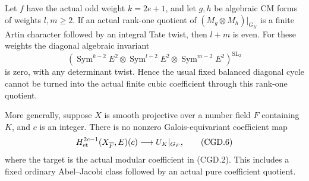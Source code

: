 \begin{proposition}
\label{AC-G69-parity}
Let \(f\) have the actual odd weight \(k=2e+1\), and
let \(g,h\) be algebraic CM forms of weights
\(l,m\ge2\). If an actual rank-one quotient of
\((M_g\otimes M_h)|_{G_K}\) is a finite Artin character
followed by an integral Tate twist, then \(l+m\) is even.
For these weights the diagonal algebraic invariant
\[
 \left(\operatorname{Sym}^{k-2}E^2\otimes
       \operatorname{Sym}^{l-2}E^2\otimes
       \operatorname{Sym}^{m-2}E^2\right)^{\operatorname{SL}_2}
                                                               \tag{CGD.5}
\]
is zero, with any determinant twist. Hence the usual fixed
balanced diagonal cycle cannot be turned into the actual
finite cubic coefficient through this rank-one quotient.

More generally, suppose \(X\) is smooth projective over a
number field \(F\) containing \(K\), and \(c\) is an integer. There is no nonzero
Galois-equivariant coefficient map
\[
 H^{2c-1}_{\rm et}(X_{\overline F},E)(c)
                    \longrightarrow U_K|_{G_F},        \tag{CGD.6}
\]
where the target is the actual modular coefficient in
(CGD.2). This includes a fixed ordinary Abel--Jacobi class
followed by an actual pure coefficient quotient.
\end{proposition}
